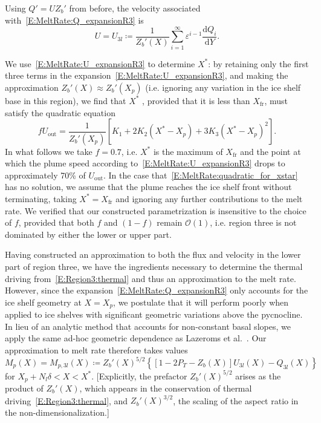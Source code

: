 \documentclass[openacc]{rsproca_new}%
\newcommand{\dd}[2]{\frac{\mathrm{d} #1}{\mathrm{d} #2}}
\newcommand{\order}[1]{\mathcal{O}(#1)}
\newcommand{\blue}[1]{{\color{blue} #1}}
\newcommand{\lt}{\delta} %
\newcommand{\Pt}{\textit{P}_T}
\newcommand{\out}{\text{out}}
\begin{document}
Using $Q' = U Z_b'$ from before, the velocity associated with~\eqref{E:MeltRate:Q_expansionR3} is
 \begin{equation}\label{E:MeltRate:U_expansionR3}
U = U_{3l} \coloneqq \frac{1}{Z_b'(X)} \sum_{i = 1}^{\infty} \varepsilon^{i-1} \dd{Q_i}{Y}.
\end{equation}

We use~\eqref{E:MeltRate:U_expansionR3} to determine $X^*$: by retaining only the first three terms in the expansion~\eqref{E:MeltRate:U_expansionR3}, and making the approximation  $Z_b'(X) \approx Z_b'(X_p)$ (i.e. ignoring any variation in the ice shelf base in this region), we find that $X^*$\blue{, provided that it is less than $X_{\text{fr}}$,} must satisfy the quadratic equation
\begin{equation}\label{E:MeltRate:quadratic_for_xstar}
f U_\out = \frac{1}{Z_b'(X_p)}\left[K_1 + 2 K_2(X^* - X_p) + 3K_3(X^* - X_p)^2 \right].
\end{equation}
In what follows we take $f = 0.7$, i.e. $X^*$ is the \blue{maximum of $X_{\text{fr}}$} and the point at which the plume speed according to~\eqref{E:MeltRate:U_expansionR3} drops to approximately 70\% of $U_\out$. In the case that~\eqref{E:MeltRate:quadratic_for_xstar} has no solution, we assume that the plume reaches the ice shelf front without terminating, taking $X^* = X_{\text{fr}}$ and ignoring any further contributions to the melt rate. \blue{We verified that our constructed parametrization is insensitive to the choice of $f$, provided that both $f$ and $(1-f)$ remain $\order{1}$, i.e. region three is not dominated by either the lower or upper part.}

Having constructed an approximation to both the flux and velocity in the lower part of region three, we have the ingredients necessary to determine the thermal driving from~\eqref{E:Region3:thermal} and thus an approximation to the melt rate. However, since the expansion~\eqref{E:MeltRate:Q_expansionR3} only accounts for the ice shelf geometry at $X = X_p$, we postulate that it will perform poorly when applied to ice shelves with significant geometric variations above the pycnocline. In lieu of an analytic method that accounts for non-constant basal slopes, we apply the same ad-hoc geometric dependence as Lazeroms et al.~\cite{Lazeroms2018TheCryo}. Our approximation to melt rate therefore takes values
\begin{equation}\label{E:MeltRate:regions3_l}
M_{p}(X) = M_{p,3l}(X)\coloneqq Z_b'(X)^{5/2}\left\{\left[1  - 2\Pt -  Z_b(X)\right] U_{3l}(X) - Q_{3l}(X)\right\}
\end{equation}
for $X_p + N_l \lt < X < X^*$. [Explicitly, the prefactor $Z_b'(X)^{5/2}$ arises as the product of $Z_b'(X)$, which appears in the conservation of thermal driving~\eqref{E:Region3:thermal}, and $Z_b'(X)^{3/2}$, the scaling of the aspect ratio in the non-dimensionalization.]
\end{document}
